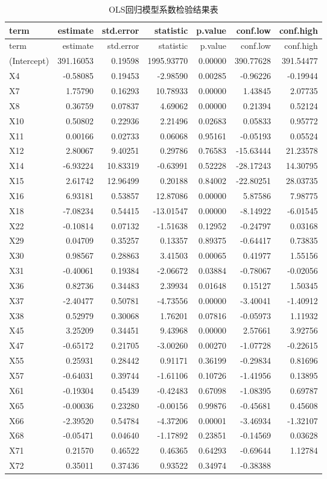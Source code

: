 \documentclass[
]{article}
\begin{document}
\begin{longtable}[]{@{}lrrrrrr@{}}
\caption{OLS回归模型系数检验结果表}\tabularnewline
\toprule
term & estimate & std.error & statistic & p.value & conf.low &
conf.high\tabularnewline
\midrule
\endfirsthead
\toprule
term & estimate & std.error & statistic & p.value & conf.low &
conf.high\tabularnewline
\midrule
\endhead
(Intercept) & 391.16053 & 0.19598 & 1995.93770 & 0.00000 & 390.77628 &
391.54477\tabularnewline
X4 & -0.58085 & 0.19453 & -2.98590 & 0.00285 & -0.96226 &
-0.19944\tabularnewline
X7 & 1.75790 & 0.16293 & 10.78933 & 0.00000 & 1.43845 &
2.07735\tabularnewline
X8 & 0.36759 & 0.07837 & 4.69062 & 0.00000 & 0.21394 &
0.52124\tabularnewline
X10 & 0.50802 & 0.22936 & 2.21496 & 0.02683 & 0.05833 &
0.95772\tabularnewline
X11 & 0.00166 & 0.02733 & 0.06068 & 0.95161 & -0.05193 &
0.05524\tabularnewline
X12 & 2.80067 & 9.40251 & 0.29786 & 0.76583 & -15.63444 &
21.23578\tabularnewline
X14 & -6.93224 & 10.83319 & -0.63991 & 0.52228 & -28.17243 &
14.30795\tabularnewline
X15 & 2.61742 & 12.96499 & 0.20188 & 0.84002 & -22.80251 &
28.03735\tabularnewline
X16 & 6.93181 & 0.53857 & 12.87086 & 0.00000 & 5.87586 &
7.98775\tabularnewline
X18 & -7.08234 & 0.54415 & -13.01547 & 0.00000 & -8.14922 &
-6.01545\tabularnewline
X22 & -0.10814 & 0.07132 & -1.51638 & 0.12952 & -0.24797 &
0.03168\tabularnewline
X29 & 0.04709 & 0.35257 & 0.13357 & 0.89375 & -0.64417 &
0.73835\tabularnewline
X30 & 0.98567 & 0.28863 & 3.41503 & 0.00065 & 0.41977 &
1.55156\tabularnewline
X31 & -0.40061 & 0.19384 & -2.06672 & 0.03884 & -0.78067 &
-0.02056\tabularnewline
X36 & 0.82736 & 0.34483 & 2.39934 & 0.01648 & 0.15127 &
1.50345\tabularnewline
X37 & -2.40477 & 0.50781 & -4.73556 & 0.00000 & -3.40041 &
-1.40912\tabularnewline
X38 & 0.52979 & 0.30068 & 1.76201 & 0.07816 & -0.05973 &
1.11932\tabularnewline
X45 & 3.25209 & 0.34451 & 9.43968 & 0.00000 & 2.57661 &
3.92756\tabularnewline
X47 & -0.65172 & 0.21705 & -3.00260 & 0.00270 & -1.07728 &
-0.22615\tabularnewline
X55 & 0.25931 & 0.28442 & 0.91171 & 0.36199 & -0.29834 &
0.81696\tabularnewline
X57 & -0.64031 & 0.39744 & -1.61106 & 0.10726 & -1.41956 &
0.13895\tabularnewline
X61 & -0.19304 & 0.45439 & -0.42483 & 0.67098 & -1.08395 &
0.69787\tabularnewline
X65 & -0.00036 & 0.23280 & -0.00156 & 0.99876 & -0.45681 &
0.45608\tabularnewline
X66 & -2.39520 & 0.54784 & -4.37206 & 0.00001 & -3.46934 &
-1.32107\tabularnewline
X68 & -0.05471 & 0.04640 & -1.17892 & 0.23851 & -0.14569 &
0.03628\tabularnewline
X71 & 0.21570 & 0.46522 & 0.46365 & 0.64293 & -0.69644 &
1.12784\tabularnewline
X72 & 0.35011 & 0.37436 & 0.93522 & 0.34974 & -0.38388 &

\end{longtable}
\end{document}
